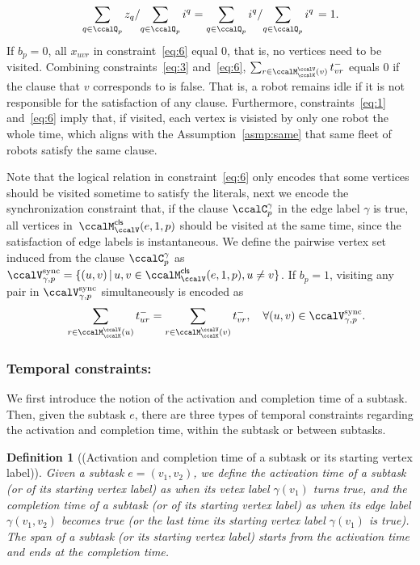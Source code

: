 \documentclass[Afour,sageh,times]{sagej}
\newtheorem{defn}[thm]{Definition}
\begin{document}
{{{  \begin{align*}
   \left. \sum_{q\in \ccalQ_p} z_q \small/ {\sum_{q\in \ccalQ_p} i^q} = {\sum_{q\in \ccalQ_p} i^q} \small/{\sum_{q\in \ccalQ_p} i^q} \right. = 1.
  \end{align*}
If $b_p=0$, all $x_{uvr}$ in constraint~\eqref{eq:6} equal 0, that is, no vertices need to be visited. Combining constraints~\eqref{eq:3} and~\eqref{eq:6}, $\sum_{r\in \ccalM^\ccalV_{\ccalK}(v)} t^-_{vr}$ equals 0 if the  clause that $v$ corresponds to is false. That is, a robot remains idle if it is not responsible for the satisfaction of any clause. Furthermore, constraints~\eqref{eq:1} and~\eqref{eq:6} imply that, if visited, each vertex is visisted by only one robot the whole time, which aligns with the Assumption~\ref{asmp:same} that same fleet of robots satisfy the same clause.

    Note that the logical relation in constraint~\eqref{eq:6} only encodes that some vertices should be visited sometime to satisfy the literals, next we encode the synchronization constraint that, if the clause $\ccalC_p^\gamma$ in the edge label $\gamma$ is true, all vertices in~$\ccalM^\mathsf{cls}_\ccalV(e, 1,p)$ should be visited at the same time, since the satisfaction of edge labels is instantaneous.
      We define the pairwise vertex set induced from the clause $\ccalC_p^\gamma$ as  $\ccalV_{\gamma, p}^{\text{sync}} = \{(u,v)\,|\, u, v\in \ccalM^\mathsf{cls}_\ccalV(e,1,p), u\not= v \}$. If $b_p=1$, visiting any pair in $\ccalV_{\gamma, p}^{\text{sync}}$ simultaneously is encoded as
\begingroup\makeatletter\def\f@size{10}\check@mathfonts
\def\maketag@@@#1{\hbox{\m@th\normalsize\normalfont#1}}%
\begin{align}
  & \quad\quad  \sum_{r\in \ccalM^\ccalV_{\ccalK}(u)} t_{ur}^-  = \sum_{r\in \ccalM^\ccalV_{\ccalK}(v)} t_{vr}^- , \quad\forall (u,v) \in \ccalV_{\gamma, p}^{\text{sync}}.\label{eq:7}
\end{align}
\endgroup





\subsubsection{Temporal constraints:}\label{sec:temporal} We first introduce the notion of the activation and completion time of a subtask. Then, given the subtask $e$, there are three types of temporal constraints regarding the activation and completion time,  within the subtask or between subtasks.
\begin{defn}[(Activation and completion time of a subtask or its starting vertex label)]
Given a subtask $e = (v_1, v_2)$, we define the  activation time of a subtask (or of its starting  vertex label) as when its vetex label $\gamma(v_1)$ turns true, and the completion time  of a subtask (or of its starting vertex label) as when its edge label $\gamma(v_1, v_2)$ becomes true (or the last time its starting vertex label $\gamma(v_1)$ is true). The span of a subtask (or its starting vertex label) starts from the activation time and ends at the completion time.
\end{defn}
}}}
\end{document}
